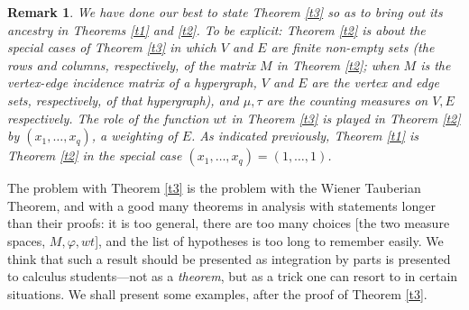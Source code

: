 \documentclass[final,1p,times]{elsarticle}
\newtheorem{rem}[thm]{Remark}
\begin{document}
\begin{rem}

We have done our best to state Theorem \ref {t3} so as to bring out its ancestry in Theorems \ref {t1} and \ref {t2}.  To be explicit:  Theorem \ref {t2} is about the special cases of Theorem \ref {t3} in which $V$ and $E$ are finite non-empty sets (the rows and columns, respectively, of the matrix $M$ in Theorem \ref {t2}; when $M$ is the vertex-edge incidence matrix of a hypergraph, $V$ and $E$ are the vertex and edge sets, respectively, of that hypergraph), and $\mu, \tau$ are the counting measures on $V, E$ respectively.  The role of the function $wt$ in Theorem \ref {t3} is played in Theorem \ref {t2} by $(x_1, \dots, x_q)$, a {\em weighting} of $E$.  As indicated previously, Theorem \ref {t1} is Theorem \ref {t2} in the special case $(x_1, \dots, x_q) = (1, \dots, 1)$.
\end{rem}

The problem with Theorem \ref {t3} is the problem with the Wiener Tauberian Theorem, and with a good many theorems in analysis with statements longer than their proofs:  it is too general, there are too many choices [the two measure spaces, $M, \varphi, wt$], and the list of hypotheses is too long to remember easily.  We think that such a result should be  presented as integration by parts is presented to calculus students---not as a {\em theorem}, but as a trick one can resort to in certain situations.  We shall present some examples, after the proof of Theorem \ref {t3}.
\end{document}
